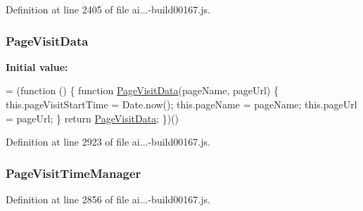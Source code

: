 Definition at line 2405 of file ai...-\/build00167.\+js.

\subsubsection[{\texorpdfstring{Page\+Visit\+Data}{PageVisitData}}]{ Page\+Visit\+Data}\hypertarget{_scripts_2ai_80_822_89-build00167_8js_aebc84d0ba279b4ed22995e577f2cdfd2}{}\label{_scripts_2ai_80_822_89-build00167_8js_aebc84d0ba279b4ed22995e577f2cdfd2}
{\bfseries Initial value\+:}
\begin{DoxyCode}
= (\textcolor{keyword}{function} () \{
                \textcolor{keyword}{function} \hyperlink{obj_2_release_2_package_2_package_tmp_2_scripts_2ai_80_822_89-build00167_8js_aebc84d0ba279b4ed22995e577f2cdfd2}{PageVisitData}(pageName, pageUrl) \{
                    this.pageVisitStartTime = Date.now();
                    this.pageName = pageName;
                    this.pageUrl = pageUrl;
                \}
                \textcolor{keywordflow}{return} \hyperlink{obj_2_release_2_package_2_package_tmp_2_scripts_2ai_80_822_89-build00167_8js_aebc84d0ba279b4ed22995e577f2cdfd2}{PageVisitData};
            \})()
\end{DoxyCode}


Definition at line 2923 of file ai...-\/build00167.\+js.

\subsubsection[{\texorpdfstring{Page\+Visit\+Time\+Manager}{PageVisitTimeManager}}]{ Page\+Visit\+Time\+Manager}\hypertarget{_scripts_2ai_80_822_89-build00167_8js_ab8b4e4ccac1decfe8615e90f908ed5ed}{}\label{_scripts_2ai_80_822_89-build00167_8js_ab8b4e4ccac1decfe8615e90f908ed5ed}


Definition at line 2856 of file ai...-\/build00167.\+js.

